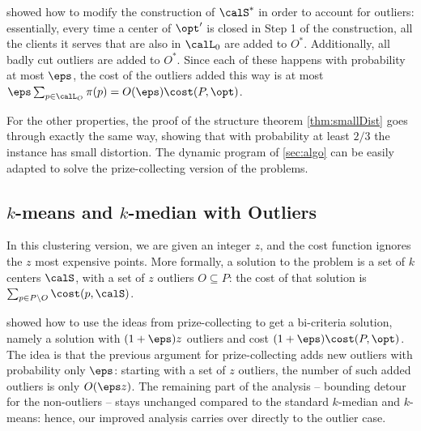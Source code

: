 \cite{jacm} showed how to modify the construction of $\calS^*$ in order to account for outliers: essentially, every time a center of $\opt'$ is closed in Step 1 of the construction, all the clients it serves that are also in $\calL_0$ are added to $O^*$. Additionally, all badly cut outliers are added to $O^*$. Since each of these happens with probability at most $\eps$, the cost of the outliers added this way is at most $\eps \sum_{p \in \calL_O} \pi(p) = O(\eps)\cost(P, \opt)$.

For the other properties, the proof of the structure theorem \cref{thm:smallDist} goes through exactly the same way, showing that with probability at least $2/3$ the instance has small distortion. The dynamic program of \cref{sec:algo} can be easily adapted to solve the prize-collecting version of the problems.


\subsection{$k$-means and $k$-median with Outliers}
In this clustering version, we are given an integer $z$, and the cost function ignores the $z$ most expensive points. More formally, a solution to the problem is a set of $k$ centers $\calS$, with a set of $z$ outliers $O \subseteq P$: the cost of that solution is $\sum_{p \in P \setminus O} \cost(p, \calS)$.

\cite{jacm} showed how to use the ideas from prize-collecting to get a bi-criteria solution, namely a solution with $(1+\eps)z$ outliers and cost $(1+\eps) \cost(P, \opt)$. The idea is that the previous argument for prize-collecting adds new outliers with probability only $\eps$: starting with a set of $z$ outliers, the number of such added outliers is only $O(\eps z)$. The remaining part of the analysis -- bounding detour for the non-outliers -- stays unchanged compared to the standard $k$-median and $k$-means: hence, our improved analysis carries over directly to the outlier case.




